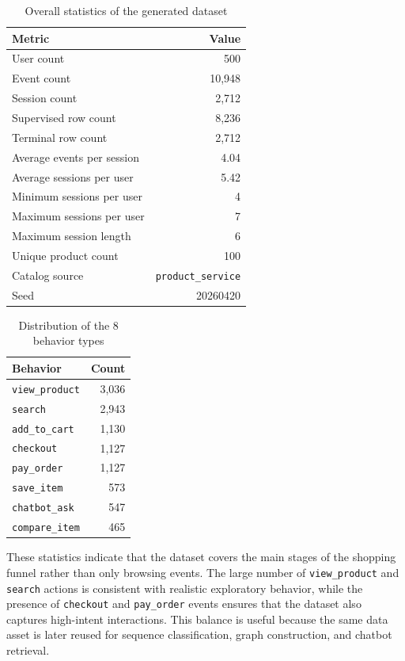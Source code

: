 \documentclass[12pt,a4paper]{article}
\begin{document}
\begin{table}[H]
\centering
\caption{Overall statistics of the generated dataset}
\begin{tabular}{lr}
\toprule
Metric & Value \\
\midrule
User count & 500 \\
Event count & 10,948 \\
Session count & 2,712 \\
Supervised row count & 8,236 \\
Terminal row count & 2,712 \\
Average events per session & 4.04 \\
Average sessions per user & 5.42 \\
Minimum sessions per user & 4 \\
Maximum sessions per user & 7 \\
Maximum session length & 6 \\
Unique product count & 100 \\
Catalog source & \texttt{product\_service} \\
Seed & 20260420 \\
\bottomrule
\end{tabular}
\end{table}

\begin{table}[H]
\centering
\caption{Distribution of the 8 behavior types}
\begin{tabular}{lr}
\toprule
Behavior & Count \\
\midrule
\texttt{view\_product} & 3,036 \\
\texttt{search} & 2,943 \\
\texttt{add\_to\_cart} & 1,130 \\
\texttt{checkout} & 1,127 \\
\texttt{pay\_order} & 1,127 \\
\texttt{save\_item} & 573 \\
\texttt{chatbot\_ask} & 547 \\
\texttt{compare\_item} & 465 \\
\bottomrule
\end{tabular}
\end{table}

These statistics indicate that the dataset covers the main stages of the shopping funnel rather than only browsing events. The large number of \texttt{view\_product} and \texttt{search} actions is consistent with realistic exploratory behavior, while the presence of \texttt{checkout} and \texttt{pay\_order} events ensures that the dataset also captures high-intent interactions. This balance is useful because the same data asset is later reused for sequence classification, graph construction, and chatbot retrieval.
\end{document}
